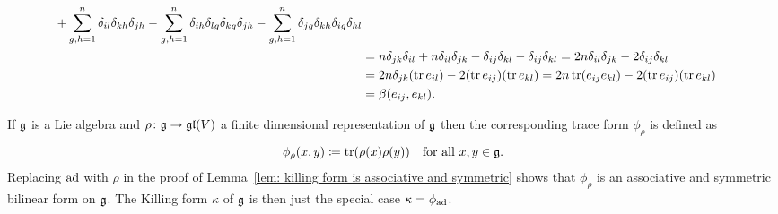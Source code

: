 \begin{expl}
\begin{align*}
     + \sum_{g,h=1}^n \delta_{il} \delta_{kh} \delta_{jh}
     - \sum_{g,h=1}^n \delta_{ih} \delta_{lg} \delta_{kg} \delta_{jh}
     - \sum_{g,h=1}^n\delta_{jg} \delta_{kh}\delta_{ig} \delta_{hl} \\
  &= n \delta_{jk} \delta_{il} + n \delta_{il} \delta_{jk} - \delta_{ij} \delta_{kl} - \delta_{ij} \delta_{kl}
  = 2n \delta_{il} \delta_{jk} - 2 \delta_{ij} \delta_{kl} \\
  &= 2n \delta_{jk} (\operatorname{tr} e_{il})  - 2 (\operatorname{tr} e_{ij})(\operatorname{tr} e_{kl})
  = 2n \operatorname{tr}(e_{ij} e_{kl}) - 2(\operatorname{tr} e_{ij})(\operatorname{tr} e_{kl}) \\
  &= \beta(e_{ij}, e_{kl}).
 \end{align*}
\end{expl}


\begin{rem}
 If $\mathfrak{g}$ is a Lie algebra and $\rho \colon \mathfrak{g} \to \mathfrak{gl}(V)$ a finite dimensional representation of $\mathfrak{g}$ then the corresponding trace form $\phi_\rho$ is defined as
 \[
  \phi_\rho(x,y) \coloneqq \operatorname{tr}(\rho(x) \rho(y)) \quad \text{for all $x,y \in \mathfrak{g}$}.
 \]
 Replacing $\operatorname{ad}$ with $\rho$ in the proof of Lemma~\ref{lem: killing form is associative and symmetric} shows that $\phi_\rho$ is an associative and symmetric bilinear form on $\mathfrak{g}$. The Killing form $\kappa$ of $\mathfrak{g}$ is then just the special case $\kappa = \phi_{\operatorname{ad}}$.
\end{rem}


